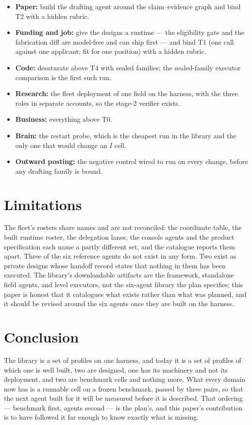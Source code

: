\begin{itemize}[leftmargin=*]
\item \textbf{Paper:} build the drafting agent around the claim--evidence graph and bind T2 with a hidden rubric.
\item \textbf{Funding and job:} give the designs a runtime --- the eligibility gate and the fabrication diff are model-free and can ship first --- and bind T1 (one call against one applicant; fit for one position) with a hidden rubric.
\item \textbf{Code:} desaturate above T4 with sealed families; the sealed-family executor comparison is the first such run.
\item \textbf{Research:} the fleet deployment of one field on the harness, with the three roles in separate accounts, so the stage-2 verifier exists.
\item \textbf{Business:} everything above T0.
\item \textbf{Brain:} the restart probe, which is the cheapest run in the library and the only one that would change an $I$ cell.
\item \textbf{Outward posting:} the negative control wired to run on every change, before any drafting family is bound.
\end{itemize}

\section{Limitations}\label{sec:limits}

The fleet's rosters share names and are not reconciled: the coordinate table, the built runtime roster, the delegation lanes, the console agents and the product specification each name a partly different set, and the catalogue reports them apart. Three of the six reference agents do not exist in any form. Two exist as private designs whose handoff record states that nothing in them has been executed. The library's downloadable artifacts are the framework, standalone field agents, and level executors, not the six-agent library the plan specifies; this paper is honest that it catalogues what exists rather than what was planned, and it should be revised around the six agents once they are built on the harness.

\section{Conclusion}

The library is a set of profiles on one harness, and today it is a set of profiles of which one is well built, two are designed, one has its machinery and not its deployment, and two are benchmark cells and nothing more. What every domain now has is a runnable cell on a frozen benchmark, passed by three pairs, so that the next agent built for it will be measured before it is described. That ordering --- benchmark first, agents second --- is the plan's, and this paper's contribution is to have followed it far enough to know exactly what is missing.

